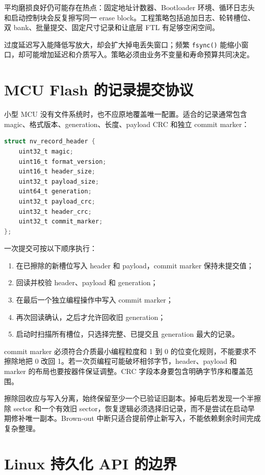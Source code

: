 平均磨损良好仍可能存在热点：固定地址计数器、Bootloader 环境、循环日志头和启动控制块会反复擦写同一 erase block。工程策略包括追加日志、轮转槽位、双 bank、批量提交、固定尺寸记录和让底层 FTL 有足够空闲空间。

过度延迟写入能降低写放大，却会扩大掉电丢失窗口；频繁 \texttt{fsync()} 能缩小窗口，却可能增加延迟和介质写入。策略必须由业务不变量和寿命预算共同决定。

\section{MCU Flash 的记录提交协议}

小型 MCU 没有文件系统时，也不应原地覆盖唯一配置。适合的记录通常包含 magic、格式版本、generation、长度、payload CRC 和独立 commit marker：

\begin{lstlisting}[language=C,caption={追加式非易失记录头（示意）}]
struct nv_record_header {
    uint32_t magic;
    uint16_t format_version;
    uint16_t header_size;
    uint32_t payload_size;
    uint64_t generation;
    uint32_t payload_crc;
    uint32_t header_crc;
    uint32_t commit_marker;
};
\end{lstlisting}

一次提交可按以下顺序执行：

\begin{enumerate}
  \item 在已擦除的新槽位写入 header 和 payload，commit marker 保持未提交值；
  \item 回读并校验 header、payload 和 generation；
  \item 在最后一个独立编程操作中写入 commit marker；
  \item 再次回读确认，之后才允许回收旧 generation；
  \item 启动时扫描所有槽位，只选择完整、已提交且 generation 最大的记录。
\end{enumerate}

commit marker 必须符合介质最小编程粒度和 1 到 0 的位变化规则，不能要求不擦除地把 0 改回 1。若一次页编程可能破坏相邻字节，header、payload 和 marker 的布局也要按器件保证调整。CRC 字段本身要包含明确字节序和覆盖范围。

擦除回收应与写入分离，始终保留至少一个已验证旧副本。掉电后若发现一个半擦除 sector 和一个有效旧 sector，恢复逻辑必须选择旧记录，而不是尝试在启动早期修补唯一副本。Brown-out 中断只适合提前停止新写入，不能依赖剩余时间完成复杂整理。

\section{Linux 持久化 API 的边界}

